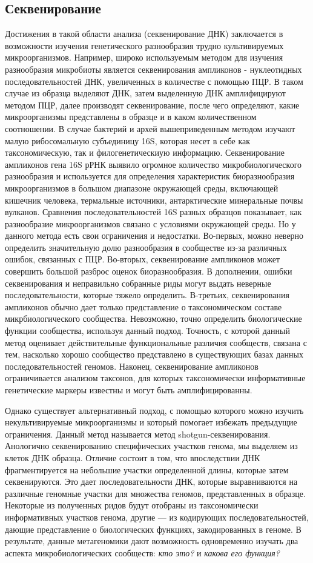 \subsection{Секвенирование}
Достижения в такой области анализа (секвенирование ДНК) заключается в возможности изучения генетического разнообразия трудно культивируемых микроорганизмов. Например,
широко используемым методом для изучения разнообразия микробиоты является секвенирования ампликонов - нуклеотидных последовательностей ДНК, увеличенных в количестве с помощью ПЦР. В таком случае из образца выделяют ДНК, затем выделенную ДНК
амплифицируют методом ПЦР, далее производят секвенирование, после чего определяют,
какие микроорганизмы представлены в образце и в каком количественном соотношении. В
случае бактерий и архей вышеприведенным методом изучают малую рибосомальную субъединицу 16S, которая несет в себе как таксономическую, так и филогенетическиую информацию. Секвенирование ампликонов гена 16S рРНК выявило огромное количество микробиологического разнообразия и используется для определения характеристик биоразнообразия микроорганизмов в большом диапазоне окружающей среды, включающей кишечник человека,
термальные источники, антарктические минеральные почвы вулканов. Сравнения последовательностей 16S разных образцов показывает, как разнообразие микроорганизмов связано
с условиями окружающей среды. Но у данного метода есть свои ограничения и недостатки. Во-первых, можно неверно определить значительную долю разнообразия в сообществе
из-за различных ошибок, связанных с ПЦР. Во-вторых, секвенирование ампликонов может
совершить большой разброс оценок биоразнообразия. В дополнении, ошибки секвенирования и неправильно собранные риды могут выдать неверные последовательности, которые тяжело определить. В-третьих, секвенирования ампликонов обычно дает только представление о таксономическом составе микрбиологического сообщества. Невозможно, точно
определить биологические функции сообщества, используя данный подход. Точность, с которой данный метод оценивает действительные функциональные различия сообществ, связана
с тем, насколько хорошо сообщество представлено в существующих базах данных последовательностей геномов. Наконец, секвенирование ампликонов ограничивается анализом таксонов, для которых таксономически информативные генетические маркеры известны и могут
быть амплифицированны.

Однако существует альтернативный подход, с помощью которого можно изучить некультивируемые микроорганизмы и который помогает избежать предыдущие ограничения. Данный метод называется метод shotgun-секвенирования. Анологично секвенированию специфических участков генома, мы выделяем из клеток ДНК образца. Отличие состоит в том,
что впоследствии ДНК фрагментируется на небольшие участки определенной длины, которые затем
секвенируются. Это дает последовательности ДНК, которые выравниваются на различные
геномные участки для множества геномов, представленных в образце. Некоторые из полученных ридов будут отобраны из таксономически информативных участков генома, другие
— из кодирующих последовательностей, дающие представление о биологических функциях,
закодированных в геноме. В результате, данные метагеномики дают возможность одновременно изучать два аспекта микробиологических сообществ: \textit{кто это?} и \textit{какова его функция?}

